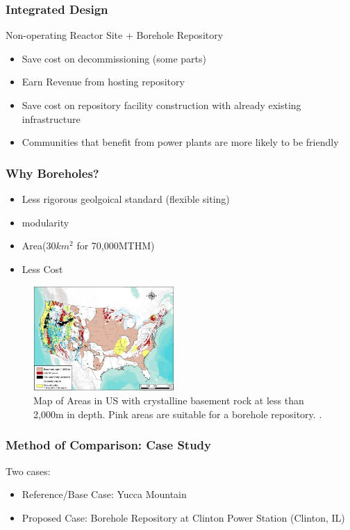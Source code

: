 \begin{frame}
	\frametitle{Integrated Design}
	Non-operating Reactor Site + Borehole Repository
	\begin{itemize}
		\item Save cost on decommissioning (some parts)
		\item Earn Revenue from hosting repository
		\item Save cost on repository facility construction
			  with already existing infrastructure
		\item Communities that benefit from power plants are more likely
			  to be friendly
	\end{itemize}
\end{frame}

\begin{frame}
	\frametitle{Why Boreholes?}
	\begin{itemize}
		\item Less rigorous geolgoical standard (flexible siting)
		\item modularity
		\item Area(30$km^2$ for 70,000MTHM)
		\item Less Cost
	\end{itemize}
	\begin{figure}[htbp!]
		\begin{center}
			\includegraphics[height=4cm]{./images/cbrock.png}
		\end{center}
		\caption{Map of Areas in US with crystalline basement rock at less than 2,000m in depth.
			Pink areas are suitable for a borehole repository.
			 \cite{freeze_siting_2015}.}
		\label{fig:basement_map}
	\end{figure}
\end{frame}

\begin{frame}
	\frametitle{Method of Comparison: Case Study}
	Two cases:
	\begin{itemize}
		\item Reference/Base Case: Yucca Mountain
		\item Proposed Case: Borehole Repository at Clinton Power Station (Clinton, IL)
	\end{itemize}
\end{frame}

